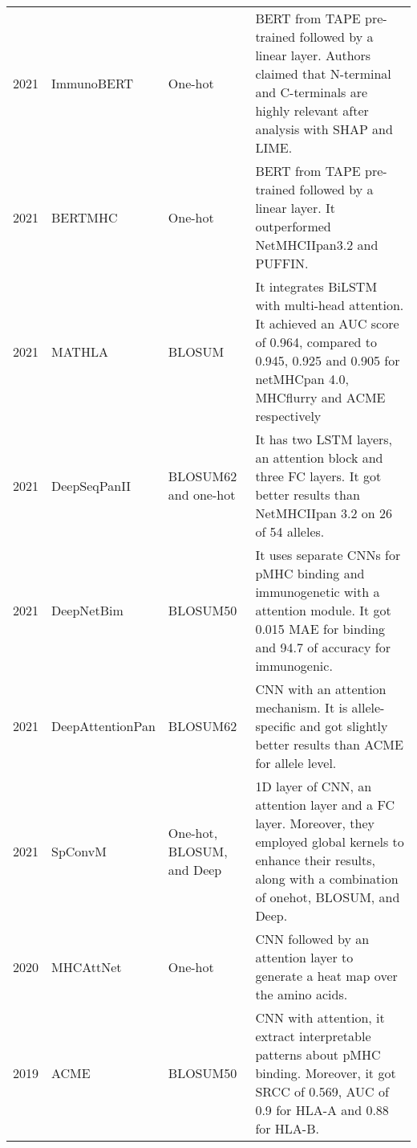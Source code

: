 \begin{table}[h]
{\begin{tabular}{p{1.3cm}p{2.2cm}p{2cm}p{9.5cm}}
			2021\cite{gasser2021interpreting}  & ImmunoBERT            & One-hot                     & BERT from TAPE pre-trained followed by a linear layer. Authors claimed that N-terminal and C-terminals are highly relevant after analysis with SHAP and LIME.   \\
			
			2021\cite{cheng2021bertmhc}             & BERTMHC              & One-hot                    & BERT from TAPE pre-trained followed by a linear layer. It outperformed NetMHCIIpan3.2 and PUFFIN.   \\
			
			2021\cite{ye2021mathla}         & MATHLA             & BLOSUM                      & 
			It integrates BiLSTM with multi-head attention. It achieved an AUC score of 0.964, compared to 0.945, 0.925 and 0.905 for netMHCpan 4.0, MHCflurry and ACME respectively  \\
			
			2021\cite{liu2021deepseqpanii}                    & DeepSeqPanII                            & BLOSUM62 and one-hot& It has two LSTM layers, an attention block and three FC layers. It got better results than NetMHCIIpan 3.2 on 26 of 54 alleles.       \\
			
			2021\cite{yang2021deepnetbim}  & DeepNetBim               & BLOSUM50            & It uses separate CNNs for pMHC binding and immunogenetic with a attention module. It got 0.015 MAE for binding and 94.7 of accuracy for immunogenic.      \\
			
			2021\cite{jin2021deep}         & DeepAttentionPan        & BLOSUM62            & CNN with an attention mechanism. It is allele-specific and got slightly better results than ACME for allele level.     \\
			
			2021\cite{chen2021ranking}  & SpConvM            &  One-hot, BLOSUM, and Deep                     &  1D layer of CNN, an attention  layer and a FC layer. Moreover, they employed global kernels to enhance their results, along with a combination of onehot, BLOSUM, and Deep.  \\
			
			2020 \cite{venkatesh2020mhcattnnet}         & MHCAttNet        & One-hot            & CNN followed by an attention layer to generate a heat map over the amino acids.     \\
			
			2019\cite{hu2019acme}          & ACME                     & BLOSUM50     & CNN with  attention, it extract interpretable patterns  about pMHC binding. Moreover, it got SRCC of 0.569, AUC of 0.9 for HLA-A and 0.88 for HLA-B.  \\    
			

\end{tabular}}
\end{table}
